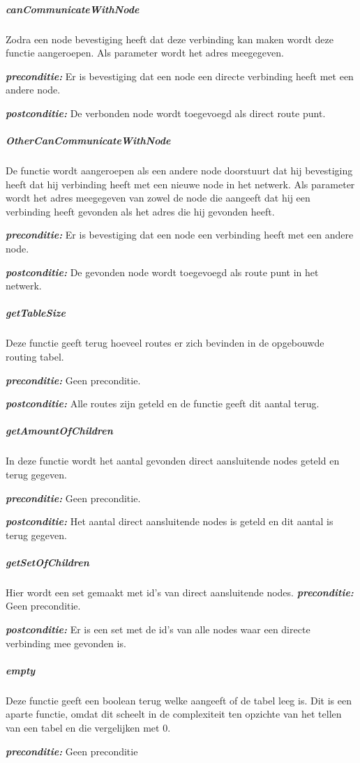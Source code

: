 \documentclass[a4paper, 11pt, oneside]{report}
\begin{document}
\subparagraph{canCommunicateWithNode}
Zodra een node bevestiging heeft dat deze verbinding kan maken wordt deze functie aangeroepen. Als parameter wordt het adres meegegeven.

\textbf{\textit{preconditie:}} Er is bevestiging dat een node een directe verbinding heeft met een andere node.

\textbf{\textit{postconditie:}} De verbonden node wordt toegevoegd als direct route punt.
 
\subparagraph{OtherCanCommunicateWithNode}
De functie wordt aangeroepen als een andere node doorstuurt dat hij bevestiging heeft dat hij verbinding heeft met een nieuwe node in het netwerk. Als parameter wordt het adres meegegeven van zowel de node die aangeeft dat hij een verbinding heeft gevonden als het adres die hij gevonden heeft.

\textbf{\textit{preconditie:}}  Er is bevestiging dat een node een verbinding heeft met een andere node.

\textbf{\textit{postconditie:}}  De gevonden node wordt toegevoegd als route punt in het netwerk.


\subparagraph{getTableSize}
Deze functie geeft terug hoeveel routes er zich bevinden in de opgebouwde routing tabel.

\textbf{\textit{preconditie:}} Geen preconditie.

\textbf{\textit{postconditie:}} Alle routes zijn geteld en de functie geeft dit aantal terug.

\subparagraph{getAmountOfChildren}
In deze functie wordt het aantal gevonden direct aansluitende nodes geteld en terug gegeven.  

\textbf{\textit{preconditie:}}  Geen preconditie.

\textbf{\textit{postconditie:}} Het aantal direct aansluitende nodes is geteld en dit aantal is terug gegeven.

\subparagraph{getSetOfChildren}
Hier wordt een set gemaakt met id's van direct aansluitende nodes. 
\textbf{\textit{preconditie:}} Geen preconditie.

\textbf{\textit{postconditie:}} Er is een set met de id's van alle nodes waar een directe verbinding mee gevonden is.

\subparagraph{empty}
Deze functie geeft een boolean terug welke aangeeft of de tabel leeg is.
Dit is een aparte functie, omdat dit scheelt in de complexiteit ten opzichte van het tellen van een tabel en die vergelijken met 0.
  
\textbf{\textit{preconditie:}} Geen preconditie
\end{document}
